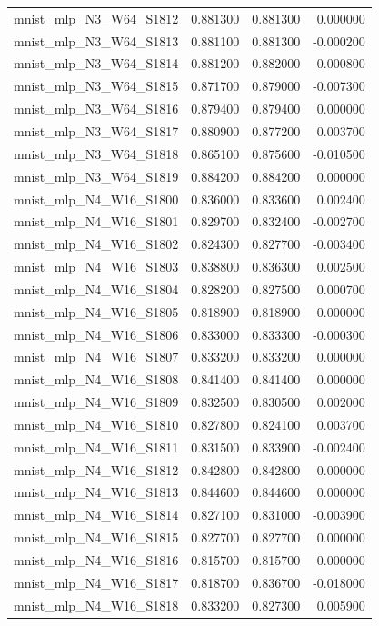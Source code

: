 \begin{tabular}{lrrr}
mnist_mlp_N3_W64_S1812 & 0.881300 & 0.881300 & 0.000000 \\
mnist_mlp_N3_W64_S1813 & 0.881100 & 0.881300 & -0.000200 \\
mnist_mlp_N3_W64_S1814 & 0.881200 & 0.882000 & -0.000800 \\
mnist_mlp_N3_W64_S1815 & 0.871700 & 0.879000 & -0.007300 \\
mnist_mlp_N3_W64_S1816 & 0.879400 & 0.879400 & 0.000000 \\
mnist_mlp_N3_W64_S1817 & 0.880900 & 0.877200 & 0.003700 \\
mnist_mlp_N3_W64_S1818 & 0.865100 & 0.875600 & -0.010500 \\
mnist_mlp_N3_W64_S1819 & 0.884200 & 0.884200 & 0.000000 \\
mnist_mlp_N4_W16_S1800 & 0.836000 & 0.833600 & 0.002400 \\
mnist_mlp_N4_W16_S1801 & 0.829700 & 0.832400 & -0.002700 \\
mnist_mlp_N4_W16_S1802 & 0.824300 & 0.827700 & -0.003400 \\
mnist_mlp_N4_W16_S1803 & 0.838800 & 0.836300 & 0.002500 \\
mnist_mlp_N4_W16_S1804 & 0.828200 & 0.827500 & 0.000700 \\
mnist_mlp_N4_W16_S1805 & 0.818900 & 0.818900 & 0.000000 \\
mnist_mlp_N4_W16_S1806 & 0.833000 & 0.833300 & -0.000300 \\
mnist_mlp_N4_W16_S1807 & 0.833200 & 0.833200 & 0.000000 \\
mnist_mlp_N4_W16_S1808 & 0.841400 & 0.841400 & 0.000000 \\
mnist_mlp_N4_W16_S1809 & 0.832500 & 0.830500 & 0.002000 \\
mnist_mlp_N4_W16_S1810 & 0.827800 & 0.824100 & 0.003700 \\
mnist_mlp_N4_W16_S1811 & 0.831500 & 0.833900 & -0.002400 \\
mnist_mlp_N4_W16_S1812 & 0.842800 & 0.842800 & 0.000000 \\
mnist_mlp_N4_W16_S1813 & 0.844600 & 0.844600 & 0.000000 \\
mnist_mlp_N4_W16_S1814 & 0.827100 & 0.831000 & -0.003900 \\
mnist_mlp_N4_W16_S1815 & 0.827700 & 0.827700 & 0.000000 \\
mnist_mlp_N4_W16_S1816 & 0.815700 & 0.815700 & 0.000000 \\
mnist_mlp_N4_W16_S1817 & 0.818700 & 0.836700 & -0.018000 \\
mnist_mlp_N4_W16_S1818 & 0.833200 & 0.827300 & 0.005900 \\

\end{tabular}

